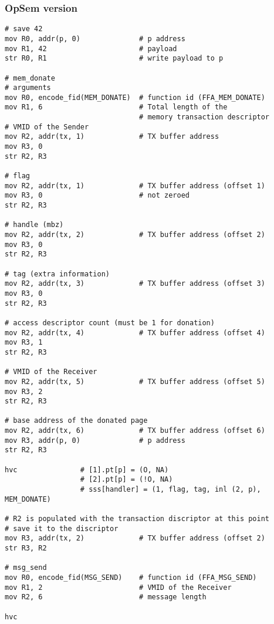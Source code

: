 \documentclass{article}
\begin{document}
\subsubsection{OpSem version}

\begin{lstlisting}[caption={VM 1}]
# save 42
mov R0, addr(p, 0)              # p address
mov R1, 42                      # payload
str R0, R1                      # write payload to p

# mem_donate
# arguments
mov R0, encode_fid(MEM_DONATE)  # function id (FFA_MEM_DONATE)
mov R1, 6                       # Total length of the  
                                # memory transaction descriptor
# VMID of the Sender 
mov R2, addr(tx, 1)             # TX buffer address                               
mov R3, 0
str R2, R3

# flag
mov R2, addr(tx, 1)             # TX buffer address (offset 1)                               
mov R3, 0                       # not zeroed
str R2, R3

# handle (mbz)
mov R2, addr(tx, 2)             # TX buffer address (offset 2)
mov R3, 0
str R2, R3

# tag (extra information)
mov R2, addr(tx, 3)             # TX buffer address (offset 3)
mov R3, 0
str R2, R3

# access descriptor count (must be 1 for donation)
mov R2, addr(tx, 4)             # TX buffer address (offset 4)
mov R3, 1
str R2, R3

# VMID of the Receiver
mov R2, addr(tx, 5)             # TX buffer address (offset 5)
mov R3, 2
str R2, R3

# base address of the donated page
mov R2, addr(tx, 6)             # TX buffer address (offset 6)
mov R3, addr(p, 0)              # p address
str R2, R3

hvc               # [1].pt[p] = (O, NA)
                  # [2].pt[p] = (!O, NA)
                  # sss[handler] = (1, flag, tag, inl (2, p), MEM_DONATE)

# R2 is populated with the transaction discriptor at this point
# save it to the discriptor
mov R3, addr(tx, 2)             # TX buffer address (offset 2)
str R3, R2

# msg_send
mov R0, encode_fid(MSG_SEND)    # function id (FFA_MSG_SEND)
mov R1, 2                       # VMID of the Receiver
mov R2, 6                       # message length

hvc
\end{lstlisting}
\end{document}
